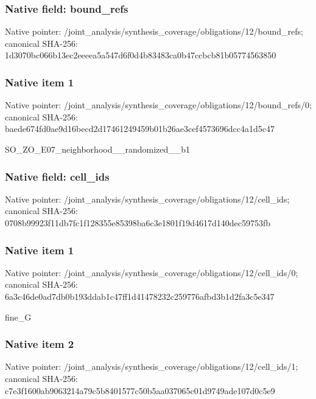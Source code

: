 \documentclass[10pt,a4paper]{article}
\begin{document}
\subsubsection{Native field: bound\_\allowbreak{}refs}
Native pointer: /joint\_\allowbreak{}analysis/synthesis\_\allowbreak{}coverage/obligations/12/bound\_\allowbreak{}refs; canonical SHA-256: 1d3070bc066b13ec2eeeea5a547d6f0d4b83483ca0b47ccbcb81b05774563850

\subsubsection{Native item 1}
Native pointer: /joint\_\allowbreak{}analysis/synthesis\_\allowbreak{}coverage/obligations/12/bound\_\allowbreak{}refs/0; canonical SHA-256: baede674fd0ae9d16becd2d17461249459b01b26ae3cef4573696dcc4a1d5c47

\begingroup\raggedright\sloppy SO\_\allowbreak{}ZO\_\allowbreak{}E07\_\allowbreak{}neighborhood\_\allowbreak{}\_\allowbreak{}randomized\_\allowbreak{}\_\allowbreak{}b1\par\endgroup

\subsubsection{Native field: cell\_\allowbreak{}ids}
Native pointer: /joint\_\allowbreak{}analysis/synthesis\_\allowbreak{}coverage/obligations/12/cell\_\allowbreak{}ids; canonical SHA-256: 0708b99923f11db7fc1f128355e85398ba6c3e1801f19d4617d140dec59753fb

\subsubsection{Native item 1}
Native pointer: /joint\_\allowbreak{}analysis/synthesis\_\allowbreak{}coverage/obligations/12/cell\_\allowbreak{}ids/0; canonical SHA-256: 6a3c46de0ad7db0b193ddab1c47ff1d41478232c259776afbd3b1d2fa3c5e347

\begingroup\raggedright\sloppy fine\_\allowbreak{}G\par\endgroup

\subsubsection{Native item 2}
Native pointer: /joint\_\allowbreak{}analysis/synthesis\_\allowbreak{}coverage/obligations/12/cell\_\allowbreak{}ids/1; canonical SHA-256: c7e3f1600ab9063214a79c5b8401577c50b5aa037065c01d9749ade107d0c5e9
\end{document}
